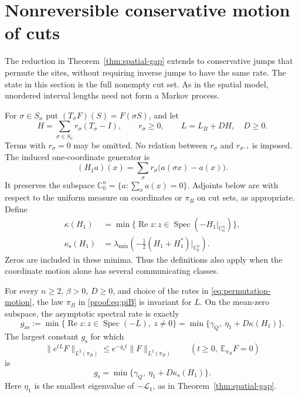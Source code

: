 \section{Nonreversible conservative motion of cuts}
\label{sec:nonreversible}

The reduction in Theorem~\ref{thm:spatial-gap} extends to conservative
jumps that permute the sites, without requiring inverse jumps to have
the same rate.  The state in this section is the full nonempty cut set.
As in the spatial model, unordered interval lengths need not form a
Markov process.

For $\sigma\in S_n$ put $(T_\sigma F)(S)=F(\sigma S)$, and let
\begin{equation}\label{eq:permutation-motion}
 H=\sum_{\sigma\in S_n}r_\sigma(T_\sigma-I),
 \qquad r_\sigma\ge0,\qquad
 L=L_B+DH,\quad D\ge0.
\end{equation}
Terms with $r_\sigma=0$ may be omitted.  No relation between
$r_\sigma$ and $r_{\sigma^{-1}}$ is imposed.
The induced one-coordinate generator is
\begin{equation}\label{eq:one-coordinate-motion}
 (H_1a)(x)=\sum_\sigma r_\sigma\bigl(a(\sigma x)-a(x)\bigr).
\end{equation}
It preserves the subspace
$\mathbb C^n_0=\{a:\sum_xa(x)=0\}$.
Adjoints below are with respect to the uniform measure on coordinates
or $\pi_B$ on cut sets, as appropriate.  Define
\begin{align}
 \kappa(H_1)
 &=\min\{\operatorname{Re}z:
             z\in\operatorname{Spec}(-H_1|_{\mathbb C^n_0})\},\label{eq:kappa-real}\\
 \kappa_{\mathrm{s}}(H_1)
 &=\lambda_{\min}\!\left(
       -\tfrac12(H_1+H_1^*)|_{\mathbb C^n_0}\right).\label{eq:kappa-symmetric}
\end{align}
Zeros are included in these minima.  Thus the definitions also apply
when the coordinate motion alone has several communicating classes.

\begin{theorem}\label{thm:nonreversible}
For every $n\ge2$, $\beta>0$, $D\ge0$, and choice of the rates in
\eqref{eq:permutation-motion}, the law $\pi_B$ in
\eqref{proof:eq:piB} is invariant for $L$.  On the mean-zero subspace,
the asymptotic spectral rate is exactly
\begin{equation}\label{eq:nonreversible-real-gap}
 g_{\mathrm{as}}
 :=\min\{\operatorname{Re}z:
            z\in\operatorname{Spec}(-L),\ z\ne0\}
 =\min\{\gamma_Q,\ \eta_1+D\kappa(H_1)\}.
\end{equation}
The largest constant $g_{\mathrm{s}}$ for which
\begin{equation}\label{eq:nonreversible-contraction}
 \|e^{tL}F\|_{L^2(\pi_B)}
 \le e^{-g_{\mathrm{s}}t}\|F\|_{L^2(\pi_B)}
 \qquad(t\ge0,\ \mathbb E_{\pi_B}F=0)
\end{equation}
is
\begin{equation}\label{eq:nonreversible-symmetric-gap}
 g_{\mathrm{s}}=\min\{\gamma_Q,\ \eta_1+D\kappa_{\mathrm{s}}(H_1)\}.
\end{equation}
Here $\eta_1$ is the smallest eigenvalue of $-\mathcal L_1$, as
in Theorem~\ref{thm:spatial-gap}.
\end{theorem}

